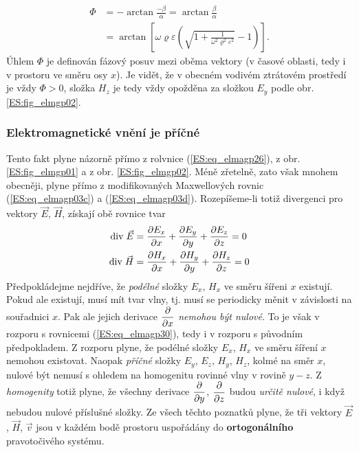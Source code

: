 {        \begin{align}\label{ES:eq_elmagp32}
          \Phi &= -\arctan\frac{-\beta}{\alpha} = \arctan\frac{\beta}{\alpha}         \nonumber \\
               &=  \arctan\left[
                            \omega\varrho\varepsilon
                              \left(\sqrt{1+
                                 \frac{1}{\omega^2\varrho^2\varepsilon^2}}-1
                              \right)
                          \right].
        \end{align}
        Úhlem \(\Phi\) je definován fázový posuv mezi oběma vektory (v časové oblasti, tedy i v 
        prostoru ve směru osy \(x\)). Je vidět, že v obecném vodivém ztrátovém prostředí je vždy 
        \(\Phi>0\), složka \(H_z\) je tedy vždy opožděna za složkou \(E_y\) podle obr. 
        \ref{ES:fig_elmgp02}.
        
      \subsubsection{Elektromagnetické vnění je příčné}
        Tento fakt plyne názorně přímo z rolvnice (\ref{ES:eq_elmagp26}), z obr. 
        \ref{ES:fig_elmgp01} a z obr. \ref{ES:fig_elmgp02}. Méně zřetelně, zato však mnohem 
        obecněji, plyne přímo z modifikovaných Maxwellových rovnic (\ref{ES:eq_elmagp03c}) a 
        (\ref{ES:eq_elmagp03d}). Rozepíšeme-li totiž divergenci pro vektory \(\vec{E}\), 
        \(\vec{H}\), získají obě rovnice tvar
        \begin{subequations}
          \begin{align}\label{ES:eq_elmagp30}
            \mathrm{div}\;\vec{E} &= \dfrac{\partial E_x}{\partial x} + \dfrac{\partial E_y}{\partial y} + \dfrac{\partial E_z}{\partial z} = 0   \nonumber \\
            \mathrm{div}\;\vec{H} &= \dfrac{\partial H_x}{\partial x} + \dfrac{\partial H_y}{\partial y} + \dfrac{\partial H_z}{\partial z} = 0
          \end{align}
        \end{subequations}
        Předpokládejme nejdříve, že \emph{podélné} složky \(E_x\), \(H_x\) ve směru šířeni \(x\) 
        existují. Pokud ale existují, musí mít tvar vlny, tj. musí se periodicky měnit v závislosti 
        na souřadnici \(x\). Pak ale jejich derivace \(\dfrac{\partial }{\partial x}\) \emph{nemohou být nulové}. To 
        je však v rozporu s rovnicemi (\ref{ES:eq_elmagp30}), tedy i v rozporu s původním 
        předpokladem. Z rozporu plyne, že podélné složky \(E_x\), \(H_x\) ve směru šíření \(x\) 
        nemohou existovat. Naopak \emph{příčné} složky \(E_y\), \(E_z\), \(H_y\), \(H_z\), kolmé na 
        směr \(x\), nulové být nemusí s ohledem na homogenitu rovinné vlny v rovině \(y-z\). Z 
        \emph{homogenity} totiž plyne, že všechny derivace \(\dfrac{\partial }{\partial y}\), \(\dfrac{\partial }{\partial z}\) 
        budou \emph{určitě nulové}, i když nebudou nulové příslušné složky. Ze všech těchto 
        poznatků plyne, že tři vektory \(\vec{E}\), \(\vec{H}\), \(\vec{v}\) jsou v každém bodě 
        prostoru uspořádány do \textbf{ortogonálního} pravotočivého systému. 

}
